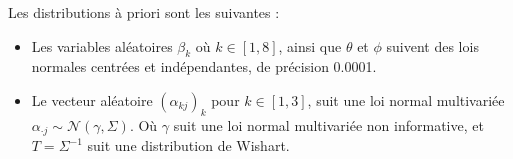     Les distributions à priori sont les suivantes : 
    \begin{itemize}
        \item Les variables aléatoires $\beta_k$ où $k \in [1,8]$, ainsi que $\theta$ et $\phi$ suivent des lois normales centrées et indépendantes, de précision 0.0001.
        \item Le vecteur aléatoire $(\alpha_{kj})_k$ pour $k \in [1,3]$, suit une loi normal multivariée $\alpha_{\cdot j} \sim \mathcal{N}( \gamma, \Sigma)$. Où $\gamma$ suit une loi normal multivariée non informative, et $T = \Sigma^{-1}$ suit une distribution de Wishart.
    \end{itemize}
 